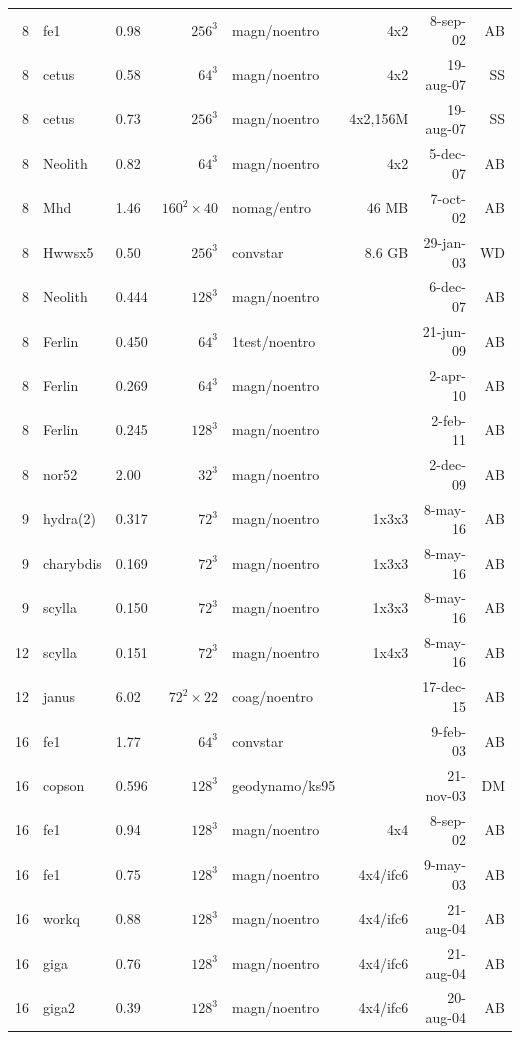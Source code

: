 \documentclass[\mydriver,12pt,twoside,notitlepage,a4paper]{article}
\begin{document}
\begin{center}
\begin{footnotesize}
\begin{longtable}{rllrlrrr}
   8 & fe1   & 0.98 & $256^3$ & magn/noentro &  4x2   &  8-sep-02 & AB \\
   8 & cetus & 0.58 & $ 64^3$ & magn/noentro &4x2     & 19-aug-07 & SS \\
   8 & cetus & 0.73 & $256^3$ & magn/noentro &4x2,156M& 19-aug-07 & SS \\
   8 &Neolith& 0.82 &  $64^3$ & magn/noentro &4x2     &  5-dec-07 & AB \\
   8 & Mhd   & 1.46 & $160^2{\!\times\!}40$
                              & nomag/entro &  46 MB &  7-oct-02 & AB \\
   8 & Hwwsx5& 0.50 & $256^3$ & convstar     & 8.6 GB & 29-jan-03 & WD \\
   8 &Neolith& 0.444& $128^3$ & magn/noentro &        &  6-dec-07 & AB \\
   8 &Ferlin & 0.450&  $64^3$ &1test/noentro &        & 21-jun-09 & AB \\
   8 &Ferlin & 0.269&  $64^3$ & magn/noentro &        &  2-apr-10 & AB \\
   8 &Ferlin & 0.245& $128^3$ & magn/noentro &        &  2-feb-11 & AB \\
   8 &nor52  & 2.00 &  $32^3$ & magn/noentro &        &  2-dec-09 & AB \\
   9 &hydra(2)&0.317&  $72^3$ & magn/noentro & 1x3x3  &  8-may-16 & AB \\
   9 &charybdis&0.169& $72^3$ & magn/noentro & 1x3x3  &  8-may-16 & AB \\
   9 &scylla & 0.150&  $72^3$ & magn/noentro & 1x3x3  &  8-may-16 & AB \\
  12 &scylla & 0.151&  $72^3$ & magn/noentro & 1x4x3  &  8-may-16 & AB \\
  12 & janus & 6.02 &  $72^2\times22$ & coag/noentro & & 17-dec-15 & AB \\
  16 & fe1   & 1.77 &  $64^3$ & convstar     &        &  9-feb-03 & AB \\
  16 & copson& 0.596& $128^3$ & geodynamo/ks95 &      & 21-nov-03 & DM \\
  16 & fe1   & 0.94 & $128^3$ & magn/noentro &  4x4   &  8-sep-02 & AB \\
  16 & fe1   & 0.75 & $128^3$ & magn/noentro &4x4/ifc6&  9-may-03 & AB \\
  16 & workq & 0.88 & $128^3$ & magn/noentro &4x4/ifc6& 21-aug-04 & AB \\
  16 & giga  & 0.76 & $128^3$ & magn/noentro &4x4/ifc6& 21-aug-04 & AB \\
  16 & giga2 & 0.39 & $128^3$ & magn/noentro &4x4/ifc6& 20-aug-04 & AB \\

\end{longtable}
\end{footnotesize}
\end{center}
\end{document}
